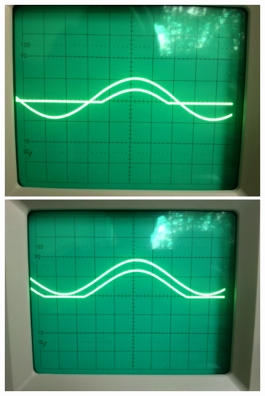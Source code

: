 \begin{figure}[htbp]
	\centering
	\begin{minipage}{.3\linewidth}
		\includegraphics[width=\linewidth]{Oszi_Foto/3-08.jpg}
	\end{minipage}
	\hfill
	\begin{minipage}{.3\linewidth}
		\includegraphics[width=\linewidth]{Oszi_Foto/3-10.jpg}
	\end{minipage}
	\hfill
	\begin{minipage}{.3\linewidth}

\end{minipage}
\end{figure}
